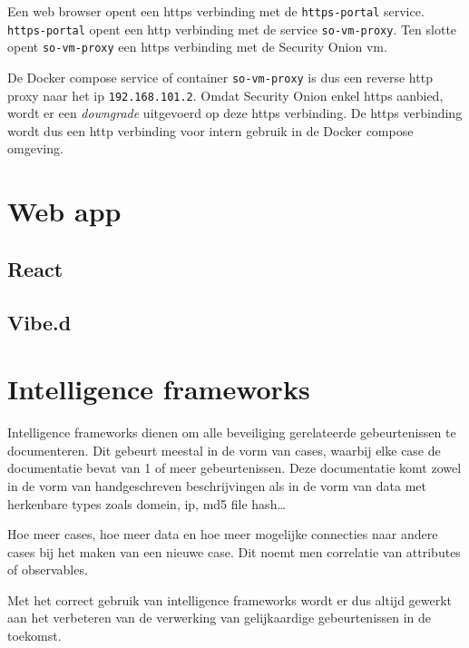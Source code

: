 \documentclass[a4paper,12pt]{report}
\begin{document}
Een web browser opent een https verbinding met de \lstinline|https-portal| service.
\lstinline|https-portal| opent een http verbinding met de service \lstinline|so-vm-proxy|.
Ten slotte opent \lstinline|so-vm-proxy| een https verbinding met de Security Onion vm.

De Docker compose service of container \lstinline|so-vm-proxy| is dus een reverse http proxy naar het ip \lstinline|192.168.101.2|.
Omdat Security Onion enkel https aanbied, wordt er een \emph{downgrade} uitgevoerd op deze https verbinding.
De https verbinding wordt dus een http verbinding voor intern gebruik in de Docker compose omgeving.

\section{Web app}
\subsection{React}
\subsection{Vibe.d}

\section{Intelligence frameworks}
Intelligence frameworks dienen om alle beveiliging gerelateerde gebeurtenissen te documenteren.
Dit gebeurt meestal in de vorm van cases, waarbij elke case de documentatie bevat van 1 of meer gebeurtenissen.
Deze documentatie komt zowel in de vorm van handgeschreven beschrijvingen als in de vorm van data met herkenbare types zoals domein, ip, md5 file hash\dots

Hoe meer cases, hoe meer data en hoe meer mogelijke connecties naar andere cases bij het maken van een nieuwe case.
Dit noemt men correlatie van attributes of observables.

Met het correct gebruik van intelligence frameworks wordt er dus altijd gewerkt aan het verbeteren van de verwerking van gelijkaardige gebeurtenissen in de toekomst.
\end{document}
